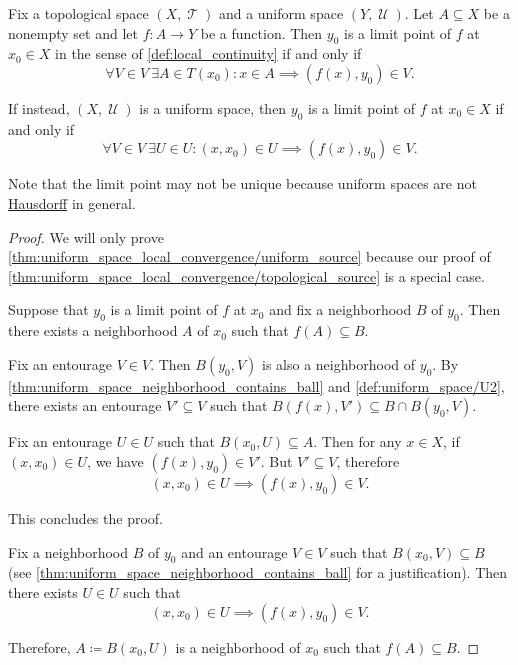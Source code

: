 \begin{proposition}\label{thm:uniform_space_local_convergence}
  Fix a topological space \( (X, \mscrT) \) and a uniform space \( (Y, \mscrU) \). Let \( A \subseteq X \) be a nonempty set and let \( f: A \to Y \) be a function. Then \( y_0 \) is a limit point of \( f \) at \( x_0 \in X \) in the sense of \cref{def:local_continuity} if and only if
  \begin{equation}\label{thm:uniform_space_local_convergence/topological_source}
    \forall V \in V \ \exists A \in T(x_0) : x \in A \implies (f(x), y_0) \in V.
  \end{equation}

  If instead, \( (X, \mscrU) \) is a uniform space, then \( y_0 \) is a limit point of \( f \) at \( x_0 \in X \) if and only if
  \begin{equation}\label{thm:uniform_space_local_convergence/uniform_source}
    \forall V \in V \ \exists U \in U : (x, x_0) \in U \implies (f(x), y_0) \in V.
  \end{equation}

  Note that the limit point may not be unique because uniform spaces are not \hyperref[def:separation_axioms/T2]{Hausdorff} in general.
\end{proposition}
\begin{proof}
  We will only prove \cref{thm:uniform_space_local_convergence/uniform_source} because our proof of \cref{thm:uniform_space_local_convergence/topological_source} is a special case.

  \SufficiencySubProof Suppose that \( y_0 \) is a limit point of \( f \) at \( x_0 \) and fix a neighborhood \( B \) of \( y_0 \). Then there exists a neighborhood \( A \) of \( x_0 \) such that \( f(A) \subseteq B \).

  Fix an entourage \( V \in V \). Then \( B(y_0, V) \) is also a neighborhood of \( y_0 \). By \cref{thm:uniform_space_neighborhood_contains_ball} and \ref{def:uniform_space/U2}, there exists an entourage \( V' \subseteq V \) such that \( B(f(x), V') \subseteq B \cap B(y_0, V) \).

  Fix an entourage \( U \in U \) such that \( B(x_0, U) \subseteq A \). Then for any \( x \in X \), if \( (x, x_0) \in U \), we have \( (f(x), y_0) \in V' \). But \( V' \subseteq V \), therefore
  \begin{equation*}
    (x, x_0) \in U \implies (f(x), y_0) \in V.
  \end{equation*}

  This concludes the proof.

  \NecessitySubProof Fix a neighborhood \( B \) of \( y_0 \) and an entourage \( V \in V \) such that \( B(x_0, V) \subseteq B \) (see \cref{thm:uniform_space_neighborhood_contains_ball} for a justification). Then there exists \( U \in U \) such that
  \begin{equation*}
    (x, x_0) \in U \implies (f(x), y_0) \in V.
  \end{equation*}

  Therefore, \( A \coloneqq B(x_0, U) \) is a neighborhood of \( x_0 \) such that \( f(A) \subseteq B \).
\end{proof}

